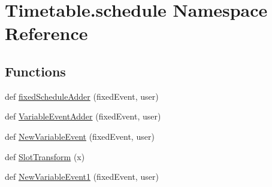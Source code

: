 \hypertarget{namespaceTimetable_1_1schedule}{}\section{Timetable.\+schedule Namespace Reference}
\label{namespaceTimetable_1_1schedule}
\subsection*{Functions}
\begin{DoxyCompactItemize}
\item 
def \hyperlink{namespaceTimetable_1_1schedule_a599a17ad5a39f6dfa33afbd7edfebefc}{fixed\+Schedule\+Adder} (fixed\+Event, user)
\item 
def \hyperlink{namespaceTimetable_1_1schedule_ae8c7968c6e9378f9a3e0abfa3f222d69}{Variable\+Event\+Adder} (fixed\+Event, user)
\item 
def \hyperlink{namespaceTimetable_1_1schedule_a3dec946c9e2d51e3995bcd0c2beb3bc2}{New\+Variable\+Event} (fixed\+Event, user)
\item 
def \hyperlink{namespaceTimetable_1_1schedule_ac7dfe1a7dd0775b89b0706cd39c25420}{Slot\+Transform} (x)
\item 
def \hyperlink{namespaceTimetable_1_1schedule_a0b527691f9d6cd5606c81f7c55245836}{New\+Variable\+Event1} (fixed\+Event, user)
\end{DoxyCompactItemize}
